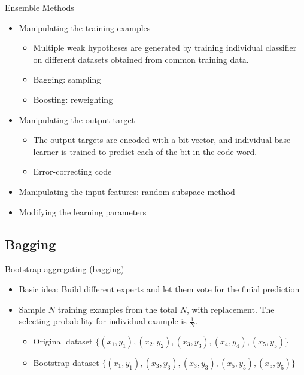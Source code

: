 \documentclass[first=dgreen,second=purple,logo=yellowexc]{aaltoslides}
\begin{document}
\begin{frame}{Ensemble Methods}
\begin{itemize}
    \item Manipulating the training examples
    \begin{itemize}
        \item Multiple weak hypotheses are generated by training individual classifier on different datasets obtained from common training data.
        \item Bagging: sampling
        \item Boosting: reweighting
    \end{itemize}
    \item Manipulating the output target
    \begin{itemize}
        \item The output targets are encoded with a bit vector, and individual base learner is trained to predict each of the bit in the code word.
        \item Error-correcting code \cite{Ghani00}
    \end{itemize}
    \item Manipulating the input features: random subspace method \cite{709601}
    \item Modifying the learning parameters
\end{itemize}
\end{frame}

\subsection{Bagging}
\begin{frame}{Bootstrap aggregating (bagging) \cite{Breiman94}}
\begin{itemize}
    \item Basic idea: Build different experts and let them vote for the finial prediction 
    \item Sample $N$ training examples from the total $N$, with replacement. The selecting probability for individual example is $\frac{1}{N}$.
    \begin{itemize}
        \item Original dataset $\{(x_1,y_1),(x_2,y_2),(x_3,y_3),(x_4,y_4),(x_5,y_5)\}$
        \item Bootstrap dataset $\{(x_1,y_1),(x_3,y_3),(x_3,y_3),(x_5,y_5),(x_5,y_5)\}$
    \end{itemize}
\end{itemize}
\end{frame}
\end{document}

